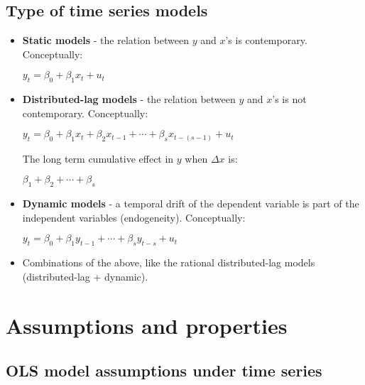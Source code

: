 \documentclass[10pt, a4paper, landscape]{article}
\begin{document}
\begin{multicols}{3}
		\subsection*{Type of time series models}
		
		\begin{itemize}[leftmargin=*]
			\item \textbf{Static models} - the relation between $y$ and $x$'s is contemporary. Conceptually:
			
			\begin{center}
				$y_{t} = \beta_{0} + \beta_{1} x_{t} + u_{t}$
			\end{center}
			
			\item \textbf{Distributed-lag models} - the relation between $y$ and $x$'s is not contemporary. Conceptually:
			
			\begin{center}
				$y_{t} = \beta_{0} + \beta_{1} x_{t} + \beta_{2} x_{t - 1} + \cdots + \beta_{s} x_{t - (s - 1)} + u_{t}$
			\end{center}
			
			The long term cumulative effect in $y$ when $\Delta x$ is:
			
			\begin{center}
				$\beta_{1} + \beta_{2} + \cdots + \beta_{s}$
			\end{center}
			
			\item \textbf{Dynamic models} - a temporal drift of the dependent variable is part of the independent variables (endogeneity). Conceptually:
			
			\begin{center}
				$y_{t} = \beta_{0} + \beta_{1} y_{t - 1} + \cdots + \beta_{s} y_{t - s} + u_{t}$
			\end{center}
			
			\item Combinations of the above, like the rational distributed-lag models (distributed-lag + dynamic).
		\end{itemize}
		
		\columnbreak
		
		\section*{Assumptions and properties}
		
		\subsection*{OLS model assumptions under time series}
		

\end{multicols}
\end{document}
